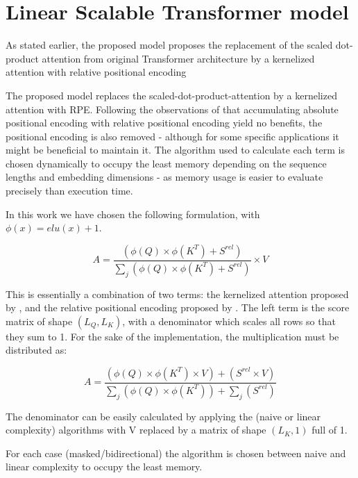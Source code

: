 \section{Linear Scalable Transformer
model}

As stated earlier, the proposed model proposes the replacement of the
scaled dot-product attention from original Transformer architecture by a
kernelized attention with relative positional encoding

The proposed model replaces the scaled-dot-product-attention by a
kernelized attention with RPE. Following the observations of
\citet{shaw2018selfattention} that
accumulating absolute positional encoding with relative positional
encoding yield no benefits, the positional encoding is also removed -
although for some specific applications it might be beneficial to
maintain it. The algorithm used to calculate each term is chosen
dynamically to occupy the least memory depending on the sequence lengths
and embedding dimensions - as memory usage is easier to evaluate
precisely than execution time.

In this work we have chosen the following formulation, with
$\phi(x) = elu(x) + 1$.

\begin{equation}
A = \frac{\left( \phi(Q) \times \phi(K^T) + S^{rel} \right)}{\sum_j \left( \phi(Q) \times \phi(K^T) + S^{rel} \right)} \times V
\end{equation}

This is essentially a combination of two terms: the kernelized attention
proposed by  \citet{katharopoulos2020transformers}, and the relative positional encoding proposed by
\citet{shaw2018selfattention}. The left
term is the score matrix of shape $(L_Q, L_K)$, with a denominator
which scales all rows so that they sum to 1. For the sake of the
implementation, the multiplication must be distributed as:

\begin{equation}
A = \frac{\left( \phi(Q) \times \phi(K^T) \times V \right) + \left( S^{rel} \times V\right)}{\sum_j \left( \phi(Q) \times \phi(K^T) \right) + \sum_j \left( S^{rel} \right)}
\end{equation}

The denominator can be easily calculated by applying the (naive or
linear complexity) algorithms with V replaced by a matrix of shape
$(L_K, 1)$ full of 1.

For each case (masked/bidirectional) the algorithm is chosen between
naive and linear complexity to occupy the least memory.

